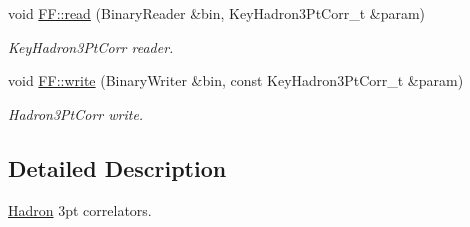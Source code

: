 \begin{DoxyCompactItemize}
void \mbox{\hyperlink{namespaceFF_a257b587cc1107da7cde8c3d17ea5ce50}{F\+F\+::read}} (Binary\+Reader \&bin, Key\+Hadron3\+Pt\+Corr\+\_\+t \&param)
\begin{DoxyCompactList}\small\item\em Key\+Hadron3\+Pt\+Corr reader. \end{DoxyCompactList}\item 
void \mbox{\hyperlink{namespaceFF_a7d3abdd11ac7f8c96ec4cfab1360b20a}{F\+F\+::write}} (Binary\+Writer \&bin, const Key\+Hadron3\+Pt\+Corr\+\_\+t \&param)
\begin{DoxyCompactList}\small\item\em Hadron3\+Pt\+Corr write. \end{DoxyCompactList}\end{DoxyCompactItemize}


\subsection{Detailed Description}
\mbox{\hyperlink{namespaceHadron}{Hadron}} 3pt correlators. 

